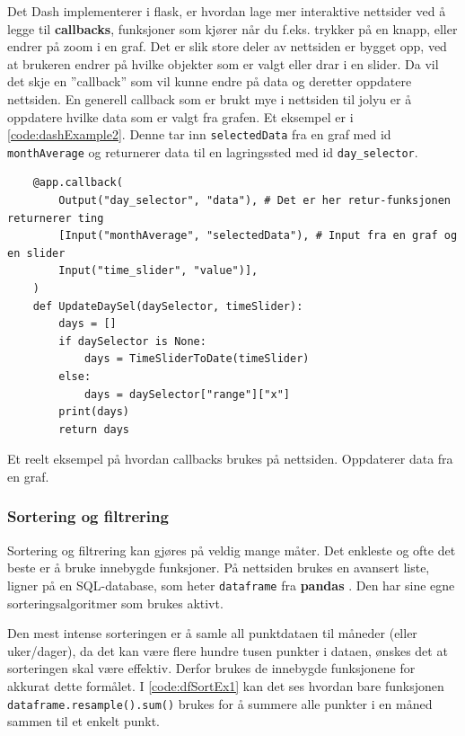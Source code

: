 Det Dash implementerer i flask, er hvordan lage mer interaktive nettsider ved å legge til \textbf{callbacks}, funksjoner som kjører når du f.eks. trykker på en knapp, eller endrer på zoom i en graf.
Det er slik store deler av nettsiden er bygget opp, ved at brukeren endrer på hvilke objekter som er valgt eller drar i en slider. Da vil det skje en ''callback'' som vil kunne endre på data og deretter oppdatere nettsiden. En generell callback som er brukt mye i nettsiden til jolyu er å oppdatere hvilke data som er valgt fra grafen. Et eksempel er i \autoref{code:dashExample2}. Denne tar inn \texttt{selectedData} fra en graf med id \texttt{monthAverage} og returnerer data til en lagringssted med id \texttt{day_selector}. 

\begin{code}
\begin{verbatim}
    @app.callback(
        Output("day_selector", "data"), # Det er her retur-funksjonen returnerer ting
        [Input("monthAverage", "selectedData"), # Input fra en graf og en slider
        Input("time_slider", "value")],
    )
    def UpdateDaySel(daySelector, timeSlider):
        days = []
        if daySelector is None:
            days = TimeSliderToDate(timeSlider)
        else:
            days = daySelector["range"]["x"]
        print(days)
        return days
\end{verbatim}
\caption{Et reelt eksempel på hvordan callbacks brukes på nettsiden. Oppdaterer data fra en graf.}
\label{code:dashExample2}
\end{code}


\subsubsection{Sortering og filtrering}

Sortering og filtrering kan gjøres på veldig mange måter. Det enkleste og ofte det beste er å bruke innebygde funksjoner. På nettsiden brukes en avansert liste, ligner på en SQL-database, som heter \texttt{dataframe} fra \textbf{pandas} \cite{dataframe}. Den har sine egne sorteringsalgoritmer som brukes aktivt. 

Den mest intense sorteringen er å samle all punktdataen til måneder (eller uker/dager), da det kan være flere hundre tusen punkter i dataen, ønskes det at sorteringen skal være effektiv. Derfor brukes de innebygde funksjonene for akkurat dette formålet. I \autoref{code:dfSortEx1} kan det ses hvordan bare funksjonen \texttt{dataframe.resample().sum()} brukes for å summere alle punkter i en måned sammen til et enkelt punkt.

